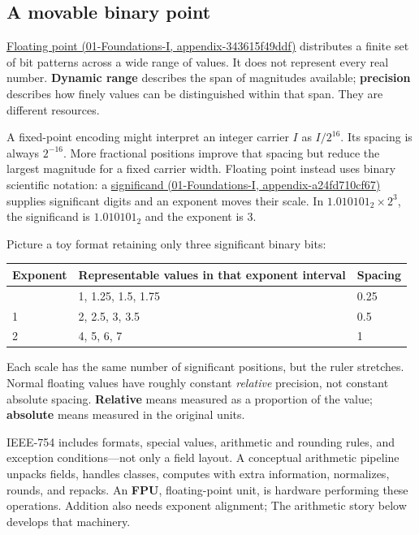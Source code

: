 \subsection{A movable binary point}\label{05-engine-i-ch001-a-movable-binary-point}

\href{../01-Foundations-I/main.pdf\#nameddest=appendix-343615f49ddf}{Floating point (01-Foundations-I, appendix-343615f49ddf)} distributes a finite set of bit patterns across a wide range of values. It does not represent every real number. \textbf{Dynamic range} describes the span of magnitudes available; \textbf{precision} describes how finely values can be distinguished within that span. They are different resources.

A fixed-point encoding might interpret an integer carrier \(I\) as \(I/2^{16}\). Its spacing is always \(2^{-16}\). More fractional positions improve that spacing but reduce the largest magnitude for a fixed carrier width. Floating point instead uses binary scientific notation: a \href{../01-Foundations-I/main.pdf\#nameddest=appendix-a24fd710cf67}{significand (01-Foundations-I, appendix-a24fd710cf67)} supplies significant digits and an exponent moves their scale. In \(1.010101_2\times2^3\), the significand is \(1.010101_2\) and the exponent is 3.

Picture a toy format retaining only three significant binary bits:

{\def\LTcaptype{none} %
\begin{longtable}[]{@{}lll@{}}
\toprule\noalign{}
Exponent & Representable values in that exponent interval & Spacing \\
\midrule\noalign{}
\endhead
\bottomrule\noalign{}
\endlastfoot
0 & 1, 1.25, 1.5, 1.75 & 0.25 \\
1 & 2, 2.5, 3, 3.5 & 0.5 \\
2 & 4, 5, 6, 7 & 1 \\
\end{longtable}
}

Each scale has the same number of significant positions, but the ruler stretches. Normal floating values have roughly constant \emph{relative} precision, not constant absolute spacing. \textbf{Relative} means measured as a proportion of the value; \textbf{absolute} means measured in the original units.

IEEE-754 includes formats, special values, arithmetic and rounding rules, and exception conditions---not only a field layout. A conceptual arithmetic pipeline unpacks fields, handles classes, computes with extra information, normalizes, rounds, and repacks. An \textbf{FPU}, floating-point unit, is hardware performing these operations. Addition also needs exponent alignment; The arithmetic story below develops that machinery.

